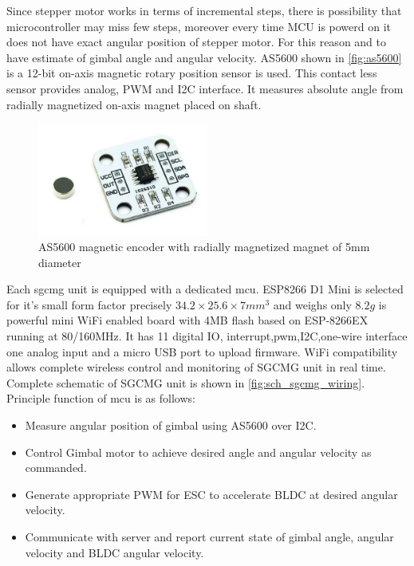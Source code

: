 \noindent Since stepper motor works in terms of incremental steps, there is possibility that microcontroller may miss few steps, moreover every time MCU is powerd on it does not have exact angular position of stepper motor. For this reason and to have estimate of gimbal angle and angular velocity. AS5600 shown in \autoref{fig:as5600} is a 12-bit on-axis magnetic rotary position sensor is used. This contact less sensor provides analog, PWM and I2C interface. It measures absolute angle from radially magnetized on-axis magnet placed on shaft. 
\begin{figure}[ht]
    \centering
    \includegraphics[width=0.5\textwidth]{figures/Assembly/AS5600.pdf}
    \caption{AS5600 magnetic encoder with radially magnetized magnet of 5mm diameter}
    \label{fig:as5600}
\end{figure}

\noindent Each \acrshort{sgcmg} unit is equipped with a dedicated \acrshort{mcu}. ESP8266 D1 Mini is selected for it's small form factor precisely $34.2\times25.6\times7 mm^3$ and weighs only $8.2g$ is powerful mini WiFi enabled board  with 4MB flash based on ESP-8266EX running at 80/160MHz. It has 11 digital IO, interrupt,pwm,I2C,one-wire interface one analog input and a micro USB port to upload firmware. WiFi compatibility allows complete wireless control and monitoring of SGCMG unit in real time. Complete schematic of SGCMG unit is shown in \autoref{fig:sch_sgcmg_wiring}. Principle function of \acrshort{mcu} is as follows:
\begin{itemize}
    \item Measure angular position of gimbal using AS5600 over I2C.
    \item Control Gimbal motor to achieve desired angle and angular velocity as commanded.
    \item Generate appropriate PWM for ESC to accelerate BLDC at desired angular velocity.
    \item Communicate with server and report current state of gimbal angle, angular velocity and BLDC angular velocity.
\end{itemize}

